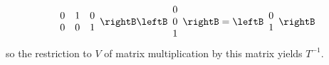 \begin{solution}
\begin{equation*}
\begin{array}{rrr}
0 & 1 & 0 \\ 
0 & 0 & 1
\end{array}
\rightB \leftB 
\begin{array}{c}
0 \\ 
0 \\ 
1
\end{array}
\rightB =\leftB 
\begin{array}{c}
0 \\ 
1
\end{array}
\rightB
\end{equation*}
so the restriction to $V$ of matrix multiplication by this matrix yields $
T^{-1}.$  
\end{solution}
